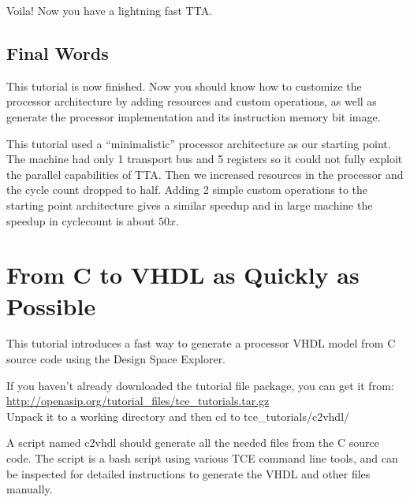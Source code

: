 \documentclass[twoside]{tceusermanual}
\begin{document}



Voila! Now you have a lightning fast TTA. %

\subsection{Final Words}

This tutorial is now finished. Now you should know how to customize
the processor architecture by adding resources and custom operations,
as well as generate the processor implementation and its instruction
memory bit image.

This tutorial used a ``minimalistic'' processor architecture as our
starting point. The machine had only 1 transport bus and 5 registers
so it could not fully exploit the parallel capabilities of TTA.  Then
we increased resources in the processor and the cycle count dropped to
half. Adding 2 simple custom operations to the starting point
architecture gives a similar speedup and in large machine the speedup
in cyclecount is about $50x$.

\section{From C to VHDL as Quickly as Possible}
\label{section:fromCtoVHDL}
 
This tutorial introduces a fast way to generate a processor VHDL model
from C source code using the Design Space Explorer.
 
If you haven't already downloaded the tutorial file package, you can get it 
from:\\
\url{http://openasip.org/tutorial_files/tce_tutorials.tar.gz} \\
Unpack it to a working directory and then cd to tce\_tutorials/c2vhdl/

A script named c2vhdl should generate all the needed files from the C source
code. The script is a bash script using various TCE command line tools, and
can be inspected for detailed instructions to generate the VHDL and other
files manually.
\end{document}
